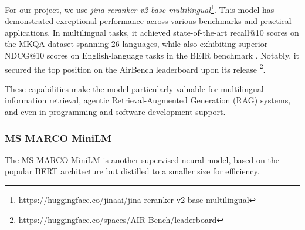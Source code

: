 For our project, we use \textit{jina-reranker-v2-base-multilingual}\footnote{\url{https://huggingface.co/jinaai/jina-reranker-v2-base-multilingual}}.
This model has demonstrated exceptional performance across various benchmarks and practical applications.
In multilingual tasks, it achieved state-of-the-art recall@10 scores on the MKQA dataset \cite{mkqa} spanning 26 languages, while also exhibiting superior NDCG@10 scores on English-language tasks in the BEIR benchmark \cite{thakur2021beirheterogenousbenchmarkzeroshot}.
Notably, it secured the top position on the AirBench leaderboard upon its release \footnote{\url{https://huggingface.co/spaces/AIR-Bench/leaderboard}}.

These capabilities make the model particularly valuable for multilingual information retrieval, agentic Retrieval-Augmented Generation (RAG) systems, and even in programming and software development support.

\subsubsection{MS MARCO MiniLM}
The MS MARCO MiniLM is another supervised neural model, based on the popular BERT architecture but distilled to a smaller size for efficiency.

\begin{table}[ht!]
    \centering
    \noindent
    \caption{Performance of Pre-trained Cross-Encoders}
    \label{tab:table2}
\end{table}

